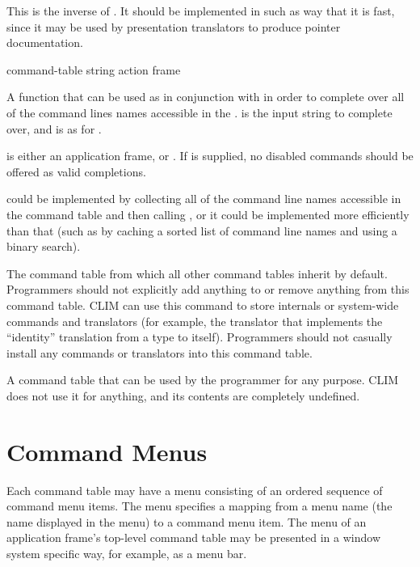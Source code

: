 This is the inverse of .  It should be
implemented in such as way that it is fast, since it may be used by presentation
translators to produce pointer documentation.

 {command-table string action \key frame}

A function that can be used as in conjunction with  in order
to complete over all of the command lines names accessible in the  .   is the input string to complete over,
and  is as for .

 is either an application frame, or .  If  is
supplied, no disabled commands should be offered as valid completions.

 could be implemented by collecting all of the
command line names accessible in the command table and then calling
, or it could be implemented more efficiently
than that (such as by caching a sorted list of command line names and using a
binary search).



The command table from which all other command tables inherit by default.
Programmers should not explicitly add anything to or remove anything from this
command table.  CLIM can use this command to store internals or system-wide
commands and translators (for example, the translator that implements the
``identity'' translation from a type to itself).  Programmers should not
casually install any commands or translators into this command table.


A command table that can be used by the programmer for any purpose.  CLIM does
not use it for anything, and its contents are completely undefined.


\section {Command Menus}

Each command table may have a menu consisting of an ordered sequence of command
menu items.  The menu specifies a mapping from a menu name (the name displayed
in the menu) to a command menu item.  The menu of an application frame's
top-level command table may be presented in a window system specific way, for
example, as a menu bar.

